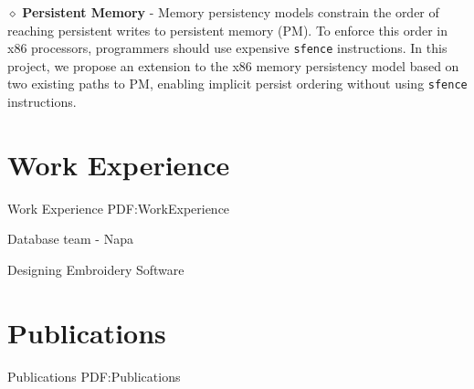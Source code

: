 \documentclass[a4paper,9pt,oneside]{article}
\begin{document}
\begin{body}
{\newline
$\diamond$
\textbf{Persistent Memory} -
Memory persistency models constrain the order of reaching persistent writes to persistent memory (PM). To enforce this order in x86 processors, programmers should use expensive \texttt{sfence} instructions. In this project, we propose an extension to the x86 memory persistency model based on two existing paths to PM, enabling implicit persist ordering without using \texttt{sfence} instructions.
}
\newline
{}


\section
{Work\newline
Experience}
{Work Experience}
{PDF:WorkExperience}


\GapNoBreak
\SubBulletItem
Database team - Napa


\GapNoBreak
\SubBulletItem
Designing Embroidery Software







\section
{Publications}
{Publications}
{PDF:Publications}


\end{body}
\end{document}
